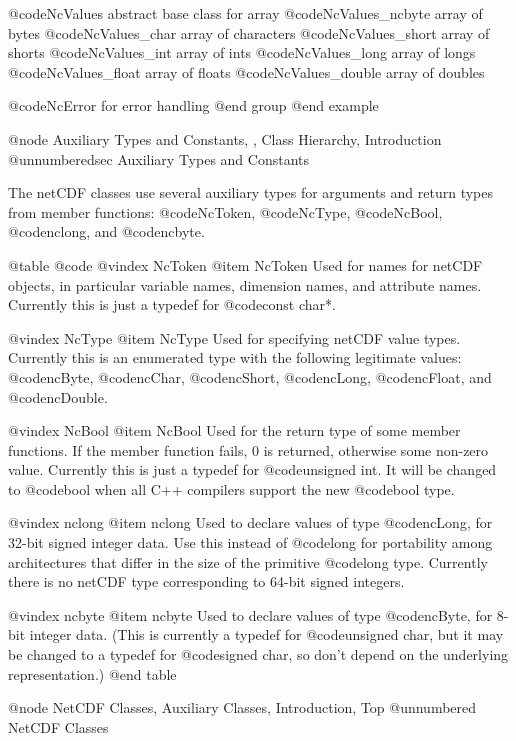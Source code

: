 @code{NcValues}                   abstract base class for array
        @code{NcValues_ncbyte}      array of bytes
        @code{NcValues_char}        array of characters
        @code{NcValues_short}       array of shorts
        @code{NcValues_int}         array of ints
        @code{NcValues_long}        array of longs
        @code{NcValues_float}       array of floats
        @code{NcValues_double}      array of doubles

@code{NcError}                    for error handling
@end group
@end example

@node Auxiliary Types and Constants,  , Class Hierarchy, Introduction
@unnumberedsec Auxiliary Types and Constants

The netCDF classes use several auxiliary types for arguments and return
types from member functions: @code{NcToken}, @code{NcType},
@code{NcBool}, @code{nclong}, and @code{ncbyte}.

@table @code
@vindex NcToken
@item NcToken
Used for names for netCDF objects, in particular variable names, dimension
names, and attribute names.  Currently this is just a typedef for
@code{const char*}.

@vindex NcType
@item NcType
Used for specifying netCDF value types.  Currently this is an enumerated
type with the following legitimate values:  @code{ncByte},
@code{ncChar}, @code{ncShort}, @code{ncLong}, @code{ncFloat}, and
@code{ncDouble}.

@vindex NcBool
@item NcBool
Used for the return type of some member functions.  If the member
function fails, 0 is returned, otherwise some non-zero value.  Currently
this is just a typedef for @code{unsigned int}.  It will be changed to
@code{bool} when all C++ compilers support the new @code{bool} type.

@vindex nclong
@item nclong
Used to declare values of type @code{ncLong}, for 32-bit signed integer
data.  Use this instead of @code{long} for portability among
architectures that differ in the size of the primitive @code{long}
type.  Currently there is no netCDF type corresponding to 64-bit signed
integers.

@vindex ncbyte
@item ncbyte
Used to declare values of type @code{ncByte}, for 8-bit integer data.
(This is currently a typedef for @code{unsigned char}, but it may be
changed to a typedef for @code{signed char}, so don't depend on the
underlying representation.)
@end table

@node NetCDF Classes, Auxiliary Classes, Introduction, Top
@unnumbered     NetCDF Classes

